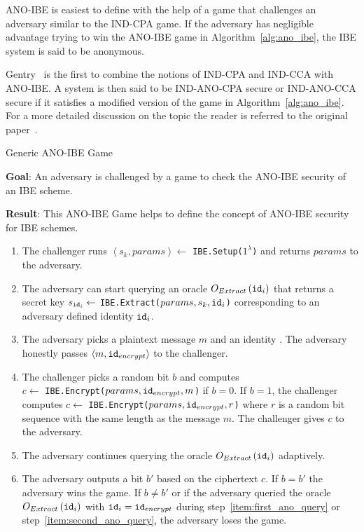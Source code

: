 ANO-IBE is easiest to define with the help of a game that challenges an adversary similar to the IND-CPA game. If the adversary has negligible advantage trying to win the ANO-IBE game in Algorithm~\ref{alg:ano_ibe}, the IBE system is said to be anonymous.

Gentry~\cite{art:Gentry06} is the first to combine the notions of IND-CPA and IND-CCA with ANO-IBE. A system is then said to be IND-ANO-CPA secure or IND-ANO-CCA secure if it satisfies a modified version of the game in Algorithm~\ref{alg:ano_ibe}. For a more detailed discussion on the topic the reader is referred to the original paper~\cite{art:Gentry06}.

\begin{algorithm}
\caption{Generic ANO-IBE Game~\cite{thesis:Alfredo08}}
\label{alg:ano_ibe}
 \textbf{Goal}: An adversary is challenged by a game to check the ANO-IBE security of an IBE scheme.
 
 \textbf{Result}: This ANO-IBE Game helps to define the concept of ANO-IBE security for IBE schemes.
 \begin{enumerate}
  \item The challenger runs $\left< s_k, params\right> \leftarrow$ \texttt{IBE.Setup($1^{\lambda}$)} and returns $params$ to the adversary.
  \item \label{item:first_ano_query} The adversary can start querying an oracle $O_{Extract} \left( \mathtt{id}_{i} \right)$ that returns a secret key $s_{\mathtt{id}_{i}} \leftarrow$ \texttt{IBE.Extract($params, s_k, \mathtt{id}_{i}$)} corresponding to an adversary defined identity $\mathtt{id}_{i}$.
  \item The adversary picks a plaintext message $m$ and an identity . The adversary honestly passes $\left< m, \mathtt{id}_{encrypt} \right>$ to the challenger.
  \item The challenger picks a random bit $b$ and computes \\ $c \leftarrow$ \texttt{IBE.Encrypt($params, \mathtt{id}_{encrypt}, m$)} if $b=0$. If $b=1$, the challenger computes $c \leftarrow$ \texttt{IBE.Encrypt($params, \mathtt{id}_{encrypt}, r$)} where $r$ is a random bit sequence with the same length as the message $m$. The challenger gives $c$ to the adversary.
  \item \label{item:second_ano_query} The adversary continues querying the oracle $O_{Extract} \left( \mathtt{id}_{i} \right)$ adaptively.
  \item The adversary outputs a bit $b'$ based on the ciphertext $c$. If $b = b'$ the adversary wins the game. If $b \neq b'$ or if the adversary queried the oracle $O_{Extract} \left( \mathtt{id}_{i} \right)$ with $\mathtt{id}_{i} = \mathtt{id}_{encrypt}$ during step~\ref{item:first_ano_query} or step~\ref{item:second_ano_query}, the adversary loses the game.
 \end{enumerate}
\end{algorithm}

